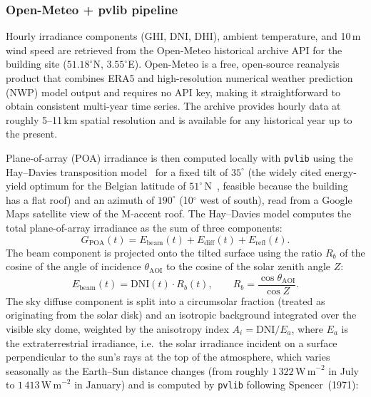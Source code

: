 \documentclass[11pt,a4paper]{report}
\begin{document}
\subsubsection*{Open-Meteo + pvlib pipeline}

Hourly irradiance components (GHI, DNI, DHI), ambient temperature, and 10\,m wind speed
are retrieved from the Open-Meteo historical archive API for the building site
($51.18^{\circ}$N, $3.55^{\circ}$E).
Open-Meteo is a free, open-source reanalysis product that combines ERA5 and
high-resolution numerical weather prediction (NWP) model output and requires no API key,
making it straightforward to obtain consistent multi-year time series.
The archive provides hourly data at roughly 5--11\,km spatial resolution and is
available for any historical year up to the present.

Plane-of-array (POA) irradiance is then computed locally with \texttt{pvlib} using the
Hay--Davies transposition model~\cite{Hay1980} for a fixed tilt of $35^{\circ}$
(the widely cited energy-yield optimum for the Belgian latitude of $51^{\circ}$\,N~\cite{Jacobson2018tilt},
feasible because the building has a flat roof) and an azimuth of $190^{\circ}$
(10$^{\circ}$ west of south), read from a Google Maps satellite view of the M-accent roof.
The Hay--Davies model computes the total plane-of-array irradiance as the sum of three
components:
\begin{equation}
    G_\mathrm{POA}(t) = E_\mathrm{beam}(t) + E_\mathrm{diff}(t) + E_\mathrm{refl}(t).
    \label{eq:poa_total}
\end{equation}
The beam component is projected onto the tilted surface using the ratio $R_b$ of the
cosine of the angle of incidence $\theta_\mathrm{AOI}$ to the cosine of the solar
zenith angle $Z$:
\begin{equation}
    E_\mathrm{beam}(t) = \mathrm{DNI}(t)\cdot R_b(t),
    \qquad R_b = \frac{\cos\theta_\mathrm{AOI}}{\cos Z}.
\end{equation}
The sky diffuse component is split into a circumsolar fraction (treated as originating
from the solar disk) and an isotropic background integrated over the visible sky dome,
weighted by the anisotropy index $A_i = \mathrm{DNI}/E_a$, where $E_a$ is the
extraterrestrial irradiance, i.e.\ the solar irradiance incident on a surface
perpendicular to the sun's rays at the top of the atmosphere, which varies
seasonally as the Earth--Sun distance changes (from roughly
$1\,322\,\mathrm{W\,m}^{-2}$ in July to $1\,413\,\mathrm{W\,m}^{-2}$ in January)
and is computed by \texttt{pvlib} following Spencer~(1971):
\end{document}
